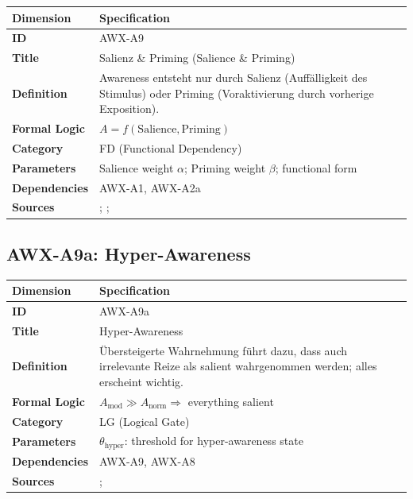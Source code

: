 \begin{table}[htbp]
\small
\begin{tabular}{p{3cm}p{11cm}}
\toprule
\textbf{Dimension} & \textbf{Specification} \\
\midrule
\textbf{ID} & AWX-A9 \\
\textbf{Title} & Salienz \& Priming (Salience \& Priming) \\
\textbf{Definition} & Awareness entsteht nur durch Salienz (Auffälligkeit des Stimulus) oder Priming (Voraktivierung durch vorherige Exposition). \\
\textbf{Formal Logic} & $A = f(\text{Salience}, \text{Priming})$ \\
\textbf{Category} & FD (Functional Dependency) \\
\textbf{Parameters} & Salience weight $\alpha$; Priming weight $\beta$; functional form \\
\textbf{Dependencies} & AWX-A1, AWX-A2a \\
\textbf{Sources} & \citet{PAP-bordalo2012salience}; \citet{bordalo2013salience}; \citet{bargh1996automaticity} \\
\bottomrule
\end{tabular}
\end{table}


\subsection{AWX-A9a: Hyper-Awareness}

\begin{table}[htbp]
\small
\begin{tabular}{p{3cm}p{11cm}}
\toprule
\textbf{Dimension} & \textbf{Specification} \\
\midrule
\textbf{ID} & AWX-A9a \\
\textbf{Title} & Hyper-Awareness \\
\textbf{Definition} & Übersteigerte Wahrnehmung führt dazu, dass auch irrelevante Reize als salient wahrgenommen werden; alles erscheint wichtig. \\
\textbf{Formal Logic} & $A_{\text{mod}} \gg A_{\text{norm}} \Rightarrow$ everything salient \\
\textbf{Category} & LG (Logical Gate) \\
\textbf{Parameters} & $\theta_{\text{hyper}}$: threshold for hyper-awareness state \\
\textbf{Dependencies} & AWX-A9, AWX-A8 \\
\textbf{Sources} & \citet{loewenstein2001risk}; \citet{rottenstreich2001money} \\
\bottomrule
\end{tabular}
\end{table}

